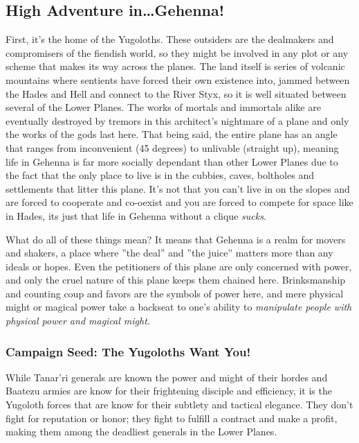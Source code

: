 \subsection{High Adventure in\ldots Gehenna!}

First, it's the home of the Yugoloths. These outsiders are the dealmakers and compromisers of the fiendish world, so they might be involved in any plot or any scheme that makes its way across the planes. The land itself is series of volcanic mountains where sentients have forced their own existence into, jammed between the Hades and Hell and connect to the River Styx, so it is well situated between several of the Lower Planes. The works of mortals and immortals alike are eventually destroyed by tremors in this architect's nightmare of a plane and only the works of the gods last here. That being said, the entire plane has an angle that ranges from inconvenient (45 degrees) to unlivable (straight up), meaning life in Gehenna is far more socially dependant than other Lower Planes due to the fact that the only place to live is in the cubbies, caves, boltholes and settlements that litter this plane. It's not that you can't live in on the slopes and are forced to cooperate and co-oexist and you are forced to compete for space like in Hades, its just that life in Gehenna without a clique \textit{sucks}.

What do all of these things mean? It means that Gehenna is a realm for movers and shakers, a place where ''the deal'' and ''the juice'' matters more than any ideals or hopes. Even the petitioners of this plane are only concerned with power, and only the cruel nature of this plane keeps them chained here. Brinksmanship and counting coup and favors are the symbols of power here, and mere physical might or magical power take a backseat to one's ability to \textit{manipulate people with physical power and magical might}.

\subsubsection{Campaign Seed: The Yugoloths Want You!}

While Tanar'ri generals are known the power and might of their hordes and Baatezu armies are know for their frightening disciple and efficiency, it is the Yugoloth forces that are know for their subtlety and tactical elegance. They don't fight for reputation or honor; they fight to fulfill a contract and make a profit, making them among the deadliest generals in the Lower Planes.

